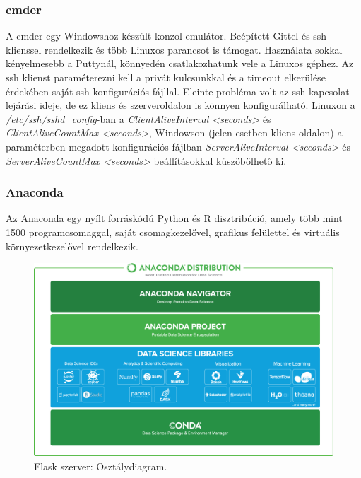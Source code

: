 \subsubsection{cmder}

A cmder egy Windowshoz készült konzol emulátor. Beépített Gittel és ssh-klienssel rendelkezik és több Linuxos parancsot is támogat. Használata sokkal kényelmesebb a Puttynál, könnyedén csatlakozhatunk vele a Linuxos géphez.
\newline
\newline
Az ssh klienst paraméterezni kell a privát kulcsunkkal és a timeout elkerülése érdekében saját ssh konfigurációs fájllal.
Eleinte probléma volt az ssh kapcsolat lejárási ideje, de ez kliens és szerveroldalon is könnyen konfigurálható. Linuxon a \emph{/etc/ssh/sshd\_config}-ban a \emph{ClientAliveInterval <seconds>} és \emph{ClientAliveCountMax <seconds>}, Windowson (jelen esetben kliens oldalon) a paraméterben megadott konfigurációs fájlban \emph{ServerAliveInterval <seconds>} és 
\emph{ServerAliveCountMax <seconds>} beállításokkal küszöbölhető ki.

\subsubsection{Anaconda}

Az Anaconda egy nyílt forráskódú Python és R disztribúció, amely több mint 1500 programcsomaggal, saját csomagkezelővel, grafikus felülettel és virtuális környezetkezelővel rendelkezik.

\begin{figure}[!ht]
	\centering
	\includegraphics[width=150mm, keepaspectratio]{figures/anaconda-overview.png}
	\caption{Flask szerver: Osztálydiagram.}
	\label{fig:anaconda-overview}
\end{figure}

